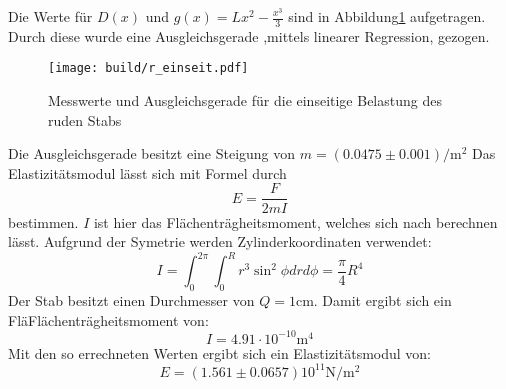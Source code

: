Die Werte für $D(x)$ und $g(x)=Lx^2-\frac{x^3}{3}$ sind in Abbildung\ref{fig:plot1} aufgetragen.
Durch diese wurde eine Ausgleichsgerade ,mittels linearer Regression, gezogen.
\begin{figure}
    \centering
    \texttt{[image: build/r\_einseit.pdf]}
    \caption{Messwerte und Ausgleichsgerade für die einseitige Belastung des ruden Stabs}
    \label{fig:plot1}
\end{figure}
%
Die Ausgleichsgerade besitzt eine Steigung von $m=(0.0475\pm 0.001)\si{\per\meter\squared}$
Das Elastizitätsmodul lässt sich mit Formel durch
\begin{equation}
  E=\frac{F}{2mI}
\end{equation}
bestimmen.
$I$ ist hier das Flächenträgheitsmoment, welches sich nach berechnen lässt.
Aufgrund der Symetrie werden Zylinderkoordinaten verwendet:
\begin{equation}
  I=\int_0^{2\pi} \int_0^R r^3 \sin^2{\phi} dr d\phi=\frac{\pi}{4}R^4
\end{equation}
Der Stab besitzt einen Durchmesser von $Q=1\si{\centi\meter}$.
Damit ergibt sich ein FläFlächenträgheitsmoment von:
\begin{equation*}
  I=4.91\cdot 10^{-10} \si{\meter}^4
\end{equation*}
Mit den so errechneten Werten ergibt sich ein Elastizitätsmodul von:
\begin{equation*}
  E=(1.561\pm0.0657)10^{11}\si{\newton\per\meter\squared}
\end{equation*}
